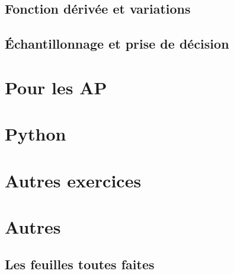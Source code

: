 \documentclass[a4paper,10pt]{book}
\begin{document}
\chapter{Fonction dérivée et variations}


\chapter{Échantillonnage et prise de décision}


\part{Pour les AP}



\part{Python}



\part{Autres exercices}



\part{Autres}

\chapter{Les feuilles toutes faites}








\end{document}
